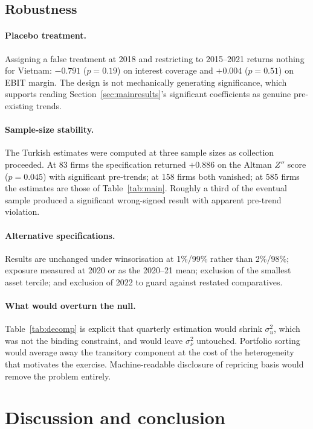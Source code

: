 \documentclass[review,12pt,authoryear]{elsarticle}
\theoremstyle{plain}
\theoremstyle{definition}
\begin{document}
\subsection{Robustness}
\label{sec:robust}



\paragraph{Placebo treatment.} Assigning a false treatment at 2018 and
restricting to 2015--2021 returns nothing for Vietnam: $-0.791$ ($p=0.19$) on
interest coverage and $+0.004$ ($p=0.51$) on EBIT margin. The design is not
mechanically generating significance, which supports reading
Section~\ref{sec:mainresults}'s significant coefficients as genuine pre-existing
trends.

\paragraph{Sample-size stability.} The Turkish estimates were computed at three
sample sizes as collection proceeded. At 83 firms the specification returned
$+0.886$ on the Altman $Z''$ score ($p=0.045$) with significant pre-trends; at
158 firms both vanished; at 585 firms the estimates are those of
Table~\ref{tab:main}. Roughly a third of the eventual sample produced a
significant wrong-signed result with apparent pre-trend violation.

\paragraph{Alternative specifications.} Results are unchanged under
winsorisation at 1\%/99\% rather than 2\%/98\%; exposure measured at 2020 or as
the 2020--21 mean; exclusion of the smallest asset tercile; and exclusion of
2022 to guard against restated comparatives.

\paragraph{What would overturn the null.} Table~\ref{tab:decomp} is explicit
that quarterly estimation would shrink $\sigma^2_u$, which was not the binding
constraint, and would leave $\sigma^2_\nu$ untouched. Portfolio sorting would
average away the transitory component at the cost of the heterogeneity that
motivates the exercise. Machine-readable disclosure of repricing basis would
remove the problem entirely.

\section{Discussion and conclusion}
\label{sec:conclusion}
\end{document}
